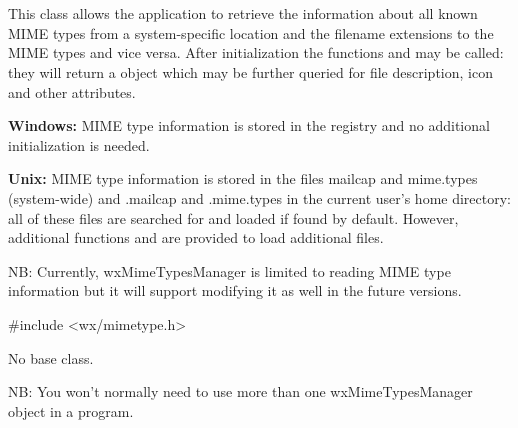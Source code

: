 \section{}\label{wxmimetypesmanager}

This class allows the application to retrieve the information about all known
MIME types from a system-specific location and the filename extensions to the
MIME types and vice versa. After initialization the functions
and  
may be called: they will return a  object which
may be further queried for file description, icon and other attributes.

{\bf Windows:} MIME type information is stored in the registry and no additional
initialization is needed.

{\bf Unix:} MIME type information is stored in the files mailcap and mime.types
(system-wide) and .mailcap and .mime.types in the current user's home directory:
all of these files are searched for and loaded if found by default. However,
additional functions 
 and
 are
provided to load additional files.

NB: Currently, wxMimeTypesManager is limited to reading MIME type information
but it will support modifying it as well in the future versions.


#include <wx/mimetype.h>


No base class.





NB: You won't normally need to use more than one wxMimeTypesManager object in a
program.

\\


